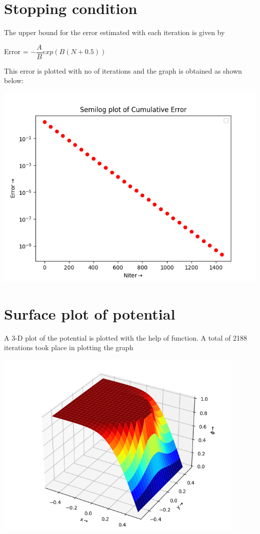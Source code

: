 \documentclass[10pt,a4paper]{article}
\begin{document}
 \section{Stopping condition}
The upper bound for the error estimated with each iteration is given by \\
\begin{center}
Error = $-\dfrac{A}{B} exp(B(N+0.5))$ 
\end{center}

This error is plotted with no of iterations and the graph is obtained as shown below:
\begin{center}
\includegraphics{5.png}
\end{center}
 
\section{Surface plot of potential}

A 3-D plot of the potential is plotted with the help of  function. A total of 2188 iterations took place in plotting the graph

\includegraphics[width = 0.9\textwidth]{6.png}
\end{document}
